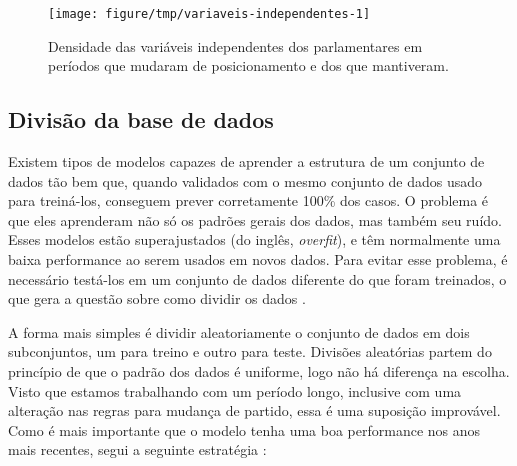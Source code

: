 \documentclass[a4paper,titlepage]{ppgi}\usepackage[]{graphicx}\usepackage[]{color}
\newenvironment{knitrout}{}{} %
\begin{document}
\begin{knitrout}
\color{fgcolor}\begin{figure}
\texttt{[image: figure/tmp/variaveis-independentes-1]} \caption[Densidade das variáveis independentes dos parlamentares em períodos que mudaram de posicionamento e dos que mantiveram]{Densidade das variáveis independentes dos parlamentares em períodos que mudaram de posicionamento e dos que mantiveram.}\label{fig:variaveis-independentes}
\end{figure}


\end{knitrout}

\subsection{Divisão da base de dados}
\label{cap:desenvolvimento:divisao-dados}


Existem tipos de modelos capazes de aprender a estrutura de um conjunto de
dados tão bem que, quando validados com o mesmo conjunto de dados usado para
treiná-los, conseguem prever corretamente 100\% dos casos. O problema é que
eles aprenderam não só os padrões gerais dos dados, mas também seu ruído. Esses
modelos estão superajustados (do inglês, \emph{overfit}), e têm normalmente uma
baixa performance ao serem usados em novos dados. Para evitar esse problema, é
necessário testá-los em um conjunto de dados diferente do que foram treinados,
o que gera a questão sobre como dividir os dados \cite{Kuhn2013}.

A forma mais simples é dividir aleatoriamente o conjunto de dados em dois
subconjuntos, um para treino e outro para teste. Divisões aleatórias partem do
princípio de que o padrão dos dados é uniforme, logo não há diferença na
escolha. Visto que estamos trabalhando com um período longo, inclusive com uma
alteração nas regras para mudança de partido, essa é uma suposição improvável.
Como é mais importante que o modelo tenha uma boa performance nos anos mais
recentes, segui a seguinte estratégia \cite{Kuhn2013}:
\end{document}
